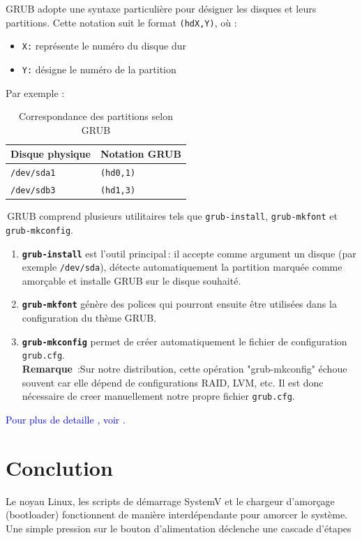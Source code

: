 \bigskip
\noindent
GRUB adopte une syntaxe particulière pour désigner les disques et leurs partitions.  
Cette notation suit le format \texttt{(hdX,Y)}, où :
\begin{itemize}
  \item \texttt{X:} représente le numéro du disque dur
  \item \texttt{Y:} désigne le numéro de la partition
\end{itemize}

\noindent
Par exemple :

\begin{table}[h!]
    \centering
    \begin{tabular}{|l|l|}
    \hline
    \textbf{Disque physique} & \textbf{Notation GRUB} \\
    \hline
    \texttt{/dev/sda1} & \texttt{(hd0,1)} \\
    \texttt{/dev/sdb3} & \texttt{(hd1,3)}\\
    
    \hline
    \end{tabular}
    \caption{Correspondance des partitions selon GRUB}
    \label{tab:grub-part}
\end{table}
\clearpage
 GRUB comprend plusieurs utilitaires tels que \texttt{grub-install}, \texttt{grub-mkfont} et \texttt{grub-mkconfig}.

\begin{enumerate}
  \item \textbf{\texttt{grub-install}} est l’outil principal : il accepte comme argument un disque (par exemple \texttt{/dev/sda}), détecte automatiquement la partition marquée comme amorçable et installe GRUB sur le disque souhaité.
  \item \textbf{\texttt{grub-mkfont}} génère des polices qui pourront ensuite être utilisées dans la configuration du thème GRUB.
  \item \textbf{\texttt{grub-mkconfig}} permet de créer automatiquement le fichier de configuration \texttt{grub.cfg}. \\
 
  \textbf{Remarque} :Sur notre distribution, cette opération "grub-mkconfig" échoue souvent car elle dépend de configurations RAID, LVM, etc. Il est donc nécessaire de creer  manuellement notre propre fichier \texttt{grub.cfg}.
\end{enumerate}


\textcolor{blue}{Pour plus de detaille , voir \cite{grub_doc}.}


\section{Conclution}
Le noyau Linux, les scripts de démarrage SystemV et le chargeur d’amorçage (bootloader) fonctionnent de manière interdépendante pour amorcer le système.  Une simple pression sur le bouton d’alimentation déclenche une cascade d’étapes 

